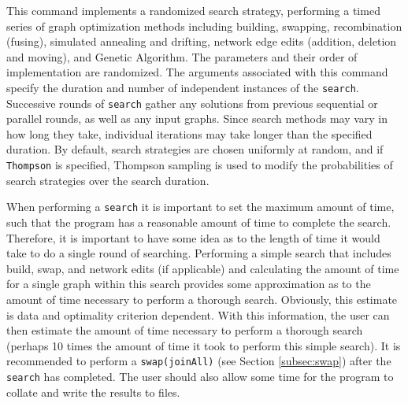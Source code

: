 	\begin{phygdescription}
		{This command implements a randomized search strategy, performing a timed 
		 series of graph optimization methods including building, swapping, 
		recombination (fusing), simulated annealing and drifting, network edge edits
		(addition, deletion and moving), and Genetic Algorithm. The parameters and 
		their order of implementation are randomized. The arguments 
		associated with this command specify the duration and number of independent 
		instances of the \texttt{search}. Successive rounds of \texttt{search} gather any 
		solutions from previous sequential or parallel rounds, as well as any input graphs. 
		Since search methods may vary in how long they take, individual iterations may 
		take longer than the specified duration. By default, search strategies are chosen 
		uniformly at random, and if \texttt{Thompson} is specified, Thompson sampling 
		\cite{Thompson1933,WheelerThompson} is used to modify the probabilities 
		of search strategies over the search duration.
		
		When performing a \texttt{search} it is important to set the maximum amount of time, 
		such that the program has a reasonable amount of time to complete the search. 
		Therefore, it is important to have some idea as to the length of time it would take 
		to do a single round of searching. Performing a simple search that includes 
		build, swap, and network edits (if applicable) and calculating the amount of time 
		for a single graph within this search provides some approximation as to the amount 
		of time necessary to perform a thorough search. Obviously, this estimate is data and 
		optimality criterion dependent. With this information, the user can then estimate the 
		amount of time necessary to perform a thorough search (perhaps 10 times the 
		amount of time it took to perform this simple search). It is recommended to perform 
		a \texttt{swap(joinAll)} (see Section \ref{subsec:swap}) after the \texttt{search} has 
		completed. The user should also allow some time for the program to collate and 
		write the results to files.}
	\end{phygdescription}
			
